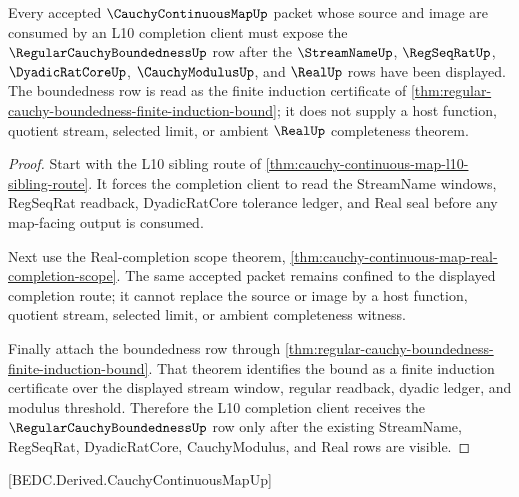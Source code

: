 \begin{theorem}
\label{thm:cauchy-continuous-map-regular-cauchy-boundedness-route}
Every accepted $\CauchyContinuousMapUp$ packet whose source and image are consumed by an L10 completion client must expose the $\RegularCauchyBoundednessUp$ row after the $\StreamNameUp$, $\RegSeqRatUp$, $\DyadicRatCoreUp$, $\CauchyModulusUp$, and $\RealUp$ rows have been displayed. The boundedness row is read as the finite induction certificate of \autoref{thm:regular-cauchy-boundedness-finite-induction-bound}; it does not supply a host function, quotient stream, selected limit, or ambient $\RealUp$ completeness theorem.
\end{theorem}
\begin{proof}
Start with the L10 sibling route of \autoref{thm:cauchy-continuous-map-l10-sibling-route}. It forces the completion client to read the StreamName windows, RegSeqRat readback, DyadicRatCore tolerance ledger, and Real seal before any map-facing output is consumed.

Next use the Real-completion scope theorem, \autoref{thm:cauchy-continuous-map-real-completion-scope}. The same accepted packet remains confined to the displayed completion route; it cannot replace the source or image by a host function, quotient stream, selected limit, or ambient completeness witness.

Finally attach the boundedness row through \autoref{thm:regular-cauchy-boundedness-finite-induction-bound}. That theorem identifies the bound as a finite induction certificate over the displayed stream window, regular readback, dyadic ledger, and modulus threshold. Therefore the L10 completion client receives the $\RegularCauchyBoundednessUp$ row only after the existing StreamName, RegSeqRat, DyadicRatCore, CauchyModulus, and Real rows are visible.
\end{proof}

[BEDC.Derived.CauchyContinuousMapUp]

